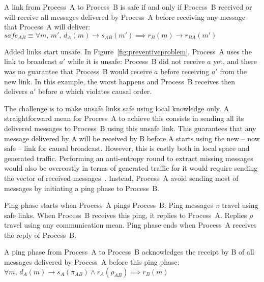 \begin{definition}
  A link from Process~A to Process~B is safe if and only if Process~B received
  or will receive all messages delivered by Process~A before receiving any
  message that Process~A will deliver:
  $safe_{AB} \equiv \forall m,\, m',\, d_A(m) \rightarrow s_{AB}(m') \implies
  r_B(m) \rightarrow r_{BA}(m')$
\end{definition}

Added links start unsafe. In Figure~\ref{fig:preventiveproblem}, Process~A uses
the link to broadcast $a'$ while it is unsafe: Process~B did not receive $a$
yet, and there was no guarantee that Process~B would receive $a$ before receiving
$a'$ from the new link. In this example, the worst happens and Process~B
receives then delivers $a'$ before $a$ which violates causal order.

The challenge is to make unsafe links safe using local knowledge only. A
straightforward mean for Process~A to achieve this consists in sending all its
delivered messages to Process~B using this unsafe link. This guarantees that any
message delivered by A will be received by B before A starts using the new --
now safe -- link for causal broadcast. However, this is costly both in local
space and generated traffic. Performing an anti-entropy round to extract missing
messages would also be overcostly in terms of generated traffic for it would
require sending the vector of received messages~\cite{demers1987epidemic}.
Instead, Process~A avoid sending most of messages by initiating a ping phase
to Process~B. 

\begin{definition}
  Ping phase starts when Process~A pings Process~B. Ping messages $\pi$ travel
  using safe links. When Process~B receives this ping, it replies to
  Process~A. Replies $\rho$ travel using any communication mean. Ping phase ends
  when Process~A receives the reply of Process~B.
\end{definition}

\begin{lemma}
  A ping phase from Process~A to Process~B acknowledges the receipt by B of all
  messages delivered by Process~A before this ping phase:
  $\forall m,\, d_A(m) \rightarrow s_A(\pi_{AB}) \wedge r_A(\rho_{AB}) \implies
  r_B(m)$
\end{lemma}

